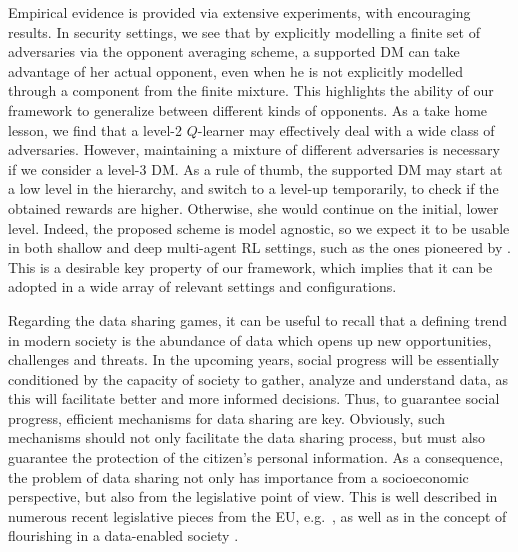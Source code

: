 Empirical evidence is provided via extensive experiments, with encouraging results. In security settings, we see that by explicitly modelling a finite set of adversaries via the opponent averaging scheme, a supported DM can take advantage of her actual opponent, even when he is not explicitly modelled through a component from the finite mixture. This highlights the ability of our framework to generalize between different kinds of opponents. As a take home lesson, we find that a level-2 $Q$-learner may effectively deal with a wide class of adversaries. However, maintaining a mixture of different adversaries is necessary if we consider a level-3 DM. As a rule of thumb, the supported DM may start at a low level in the hierarchy, and switch to a level-up temporarily, to check if the obtained rewards are higher. Otherwise, she would  continue on the initial, lower level.  %
Indeed, the proposed scheme is
model agnostic, so we expect it to be usable in both shallow and deep multi-agent RL settings, such as the ones pioneered by \cite{mnih2015human}. This is a desirable key property of our framework, which implies that it can be adopted in a wide array of relevant settings and configurations.











Regarding the data sharing games, it can be useful to recall that a defining trend in modern society is the abundance 
of data which opens up new opportunities, challenges
and threats. In the upcoming years, social progress will be essentially conditioned by the capacity of society to gather, analyze and understand data, as this will 
facilitate better and more informed decisions. 
Thus, to guarantee social progress,  efficient mechanisms
for data sharing are key. Obviously, such mechanisms
should not only facilitate the data sharing process, 
but must also guarantee the protection of the citizen's personal
information. As a consequence, the problem of data sharing not only
has importance from a socioeconomic perspective, but also from the
legislative point of view. This is well described in numerous recent legislative pieces from the 
EU, e.g.\ \cite{europe1}, as well as in the concept of flourishing 
in a data-enabled society \cite{allea}. 

